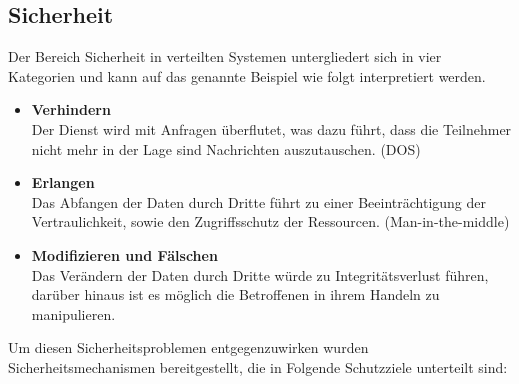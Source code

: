 \documentclass[a4paper]{scrartcl}
\begin{document}
\subsection{Sicherheit}
Der Bereich Sicherheit in verteilten Systemen untergliedert sich in vier Kategorien und kann auf das genannte Beispiel wie folgt interpretiert werden.
	\begin{itemize}

		\item \textbf{Verhindern} \\
		Der Dienst wird mit Anfragen überflutet, was dazu führt, dass die Teilnehmer nicht mehr in der Lage sind Nachrichten auszutauschen. (DOS)

		\item \textbf{Erlangen} \\
		Das Abfangen der Daten durch Dritte führt zu einer Beeinträchtigung der Vertraulichkeit, sowie den Zugriffsschutz der Ressourcen. (Man-in-the-middle)

		\item \textbf{Modifizieren und Fälschen} \\
		Das Verändern der Daten durch Dritte würde zu Integritätsverlust führen, darüber hinaus ist es möglich die Betroffenen in ihrem Handeln zu manipulieren.

	\end{itemize}
Um diesen Sicherheitsproblemen entgegenzuwirken wurden Sicherheitsmechanismen bereitgestellt, die in Folgende Schutzziele unterteilt sind:
\end{document}
